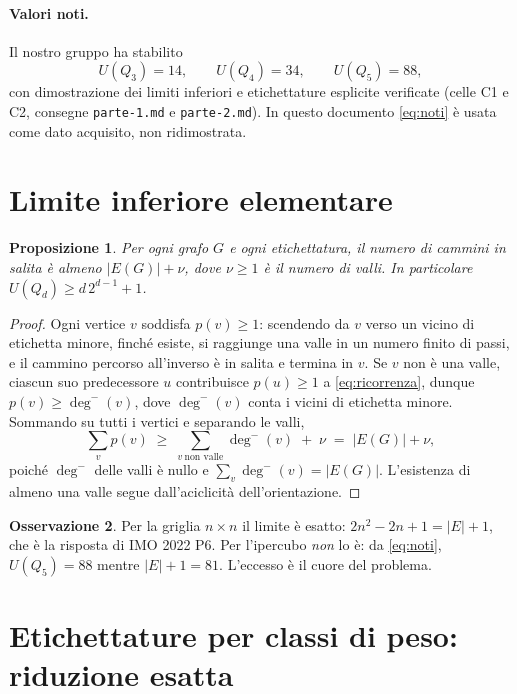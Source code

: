 \documentclass[11pt,a4paper]{article}
\theoremstyle{plain}
\newtheorem{proposition}{Proposizione}
\theoremstyle{definition}
\newtheorem{remark}[proposition]{Osservazione}
\newcommand{\Qd}{Q_d}
\begin{document}
\paragraph{Valori noti.} Il nostro gruppo ha stabilito
\begin{equation}\label{eq:noti}
U(Q_3)=14,\qquad U(Q_4)=34,\qquad U(Q_5)=88,
\end{equation}
con dimostrazione dei limiti inferiori e etichettature esplicite verificate
(celle C1 e C2, consegne \texttt{parte-1.md} e \texttt{parte-2.md}). In questo
documento \eqref{eq:noti} è usata come dato acquisito, non ridimostrata.

\section{Limite inferiore elementare}

\begin{proposition}\label{prop:inferiore}
Per ogni grafo $G$ e ogni etichettatura, il numero di cammini in salita è almeno
$|E(G)|+\nu$, dove $\nu\ge1$ è il numero di valli. In particolare
$U(\Qd)\ge d\,2^{d-1}+1$.
\end{proposition}

\begin{proof}
Ogni vertice $v$ soddisfa $p(v)\ge1$: scendendo da $v$ verso un vicino di
etichetta minore, finché esiste, si raggiunge una valle in un numero finito di
passi, e il cammino percorso all'inverso è in salita e termina in $v$. Se $v$
non è una valle, ciascun suo predecessore $u$ contribuisce $p(u)\ge1$ a
\eqref{eq:ricorrenza}, dunque $p(v)\ge\deg^-(v)$, dove $\deg^-(v)$ conta i
vicini di etichetta minore. Sommando su tutti i vertici e separando le valli,
\[
\sum_v p(v)\;\ge\;\sum_{v\ \text{non valle}}\deg^-(v)\;+\;\nu
\;=\;|E(G)|+\nu,
\]
poiché $\deg^-$ delle valli è nullo e $\sum_v\deg^-(v)=|E(G)|$. L'esistenza di
almeno una valle segue dall'aciclicità dell'orientazione.
\end{proof}

\begin{remark}
Per la griglia $n\times n$ il limite è esatto: $2n^2-2n+1=|E|+1$, che è la
risposta di IMO 2022 P6. Per l'ipercubo \emph{non} lo è: da \eqref{eq:noti},
$U(Q_5)=88$ mentre $|E|+1=81$. L'eccesso è il cuore del problema.
\end{remark}

\section{Etichettature per classi di peso: riduzione esatta}
\end{document}
